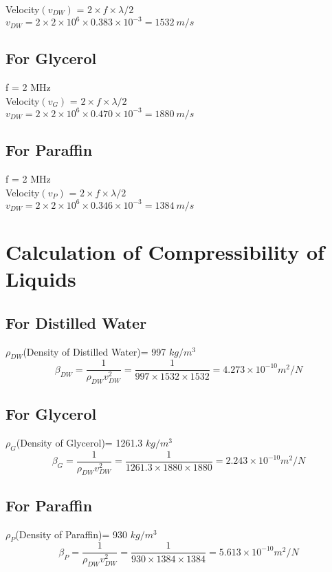 Velocity$(v_{DW})$ = $2\times f \times \lambda/2 $\\
$v_{DW} =2 \times 2 \times 10^{6} \times 0.383 \times 10^{-3} = 1532 \: m/s $
\subsection{For Glycerol}
f = 2 MHz \\

Velocity$(v_{G})$ = $2\times f \times \lambda/2 $\\
$v_{DW} =2 \times 2 \times 10^{6} \times 0.470 \times 10^{-3} = 1880 \: m/s $
\subsection{For Paraffin}
f = 2 MHz \\

Velocity$(v_{P})$ = $2\times f \times \lambda/2 $\\
$ v_{DW} =2 \times 2 \times 10^{6} \times 0.346 \times 10^{-3} = 1384 \: m/s $   
\section{Calculation of Compressibility of Liquids}

\subsection{For Distilled Water}
$\rho_{DW}$(Density of Distilled Water)= 997 $kg/m^3$ \\

\[\beta_{DW} = \frac{1}{\rho_{DW} v_{DW}^2} = \frac{1}{997 \times 1532 \times 1532} = 4.273 \times 10^{-10} m^2/N\]
\subsection{For Glycerol}
$\rho_G$(Density of Glycerol)= 1261.3 $kg/m^3$\\

\[\beta_{G} = \frac{1}{\rho_{DW} v_{DW}^2} = \frac{1}{1261.3 \times 1880 \times 1880} = 2.243\times 10^{-10} m^2/N\] 
\subsection{For Paraffin}
$\rho_P$(Density of Paraffin)= 930 $kg/m^3$\\

\[\beta_{P} = \frac{1}{\rho_{DW} v_{DW}^2} = \frac{1}{930 \times 1384 \times 1384} = 5.613 \times 10^{-10} m^2/N\] 

